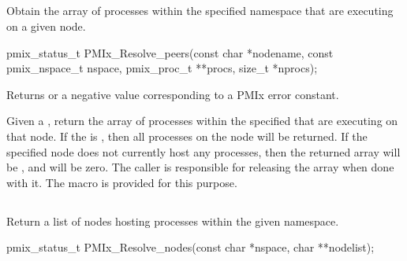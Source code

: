 \subsection{}

\summary

Obtain the array of processes within the specified namespace that are executing on a given node.

\format

\cspecificstart
\begin{codepar}
pmix_status_t
PMIx_Resolve_peers(const char *nodename,
                   const pmix_nspace_t nspace,
                   pmix_proc_t **procs, size_t *nprocs);
\end{codepar}
\cspecificend

\begin{arglist}
\end{arglist}

Returns  or a negative value corresponding to a PMIx error constant.

\descr

Given a , return the array of processes within the specified 
that are executing on that node.
If the  is , then all processes on the node will be returned.
If the specified node does not currently host any processes, then the returned array will be , and  will be zero.
The caller is responsible for releasing the  array when done with it.
The  macro is provided for this purpose.


\subsection{}

\summary

Return a list of nodes hosting processes within the given namespace.

\format

\cspecificstart
\begin{codepar}
pmix_status_t
PMIx_Resolve_nodes(const char *nspace, char **nodelist);
\end{codepar}
\cspecificend

